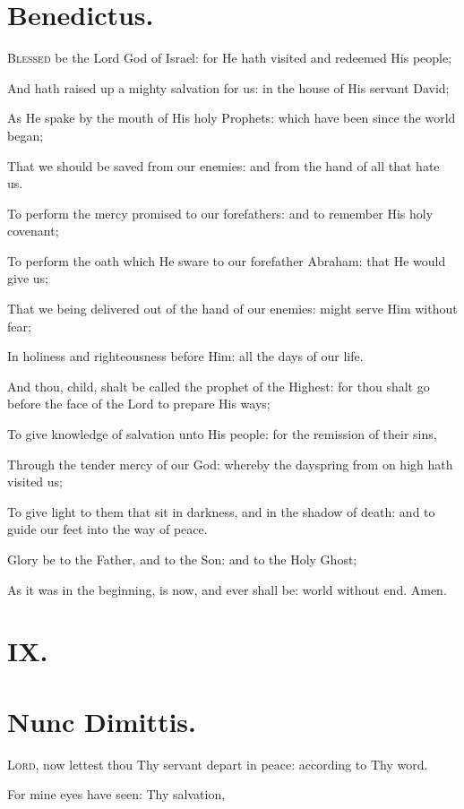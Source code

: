 \section*{Benedictus.}

\lettrine{B}{lessed} be the Lord God of Israel: for He hath visited
and redeemed His people; 

And hath raised up a mighty salvation for us: in the house of His servant David;

As He spake by the mouth of His holy Prophets: which have been since the world began;

That we should be saved from our enemies: and from the hand of all that hate us.

To perform the mercy promised to our forefathers: and to remember His holy covenant;

To perform the oath which He sware to our forefather Abraham: that He would give us;

That we being delivered out of the hand of our enemies: might serve Him without fear;

In holiness and righteousness before Him: all the days of our life.

And thou, child, shalt be called the prophet of the Highest: for thou shalt go before the face of the Lord to prepare His ways;

To give knowledge of salvation unto His people: for the remission of their sins,

Through the tender mercy of our God: whereby the dayspring from on high hath visited us;

To give light to them that sit in darkness, and in the shadow of death: and to guide our feet into the way of peace.

Glory be to the Father, and to the Son: and to the Holy Ghost;

As it was in the beginning, is now, and ever shall be: world without end. Amen.

\section*{IX.}
\section*{Nunc Dimittis.}

\lettrine{L}{ord,} now lettest thou Thy servant depart in peace: according to Thy word.

For mine eyes have seen: Thy salvation,

